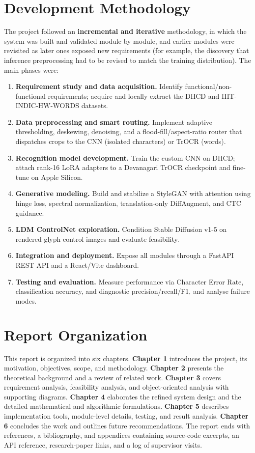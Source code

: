 \documentclass[12pt,a4paper]{report}
\begin{document}
\section{Development Methodology}
The project followed an \textbf{incremental and iterative} methodology, in which the system was built and validated module by module, and earlier modules were revisited as later ones exposed new requirements (for example, the discovery that inference preprocessing had to be revised to match the training distribution). The main phases were:
\begin{enumerate}[itemsep=2pt]
  \item \textbf{Requirement study and data acquisition.} Identify functional/non-functional requirements; acquire and locally extract the DHCD and IIIT-INDIC-HW-WORDS datasets.
  \item \textbf{Data preprocessing and smart routing.} Implement adaptive thresholding, deskewing, denoising, and a flood-fill/aspect-ratio router that dispatches crops to the CNN (isolated characters) or TrOCR (words).
  \item \textbf{Recognition model development.} Train the custom CNN on DHCD; attach rank-16 LoRA adapters to a Devanagari TrOCR checkpoint and fine-tune on Apple Silicon.
  \item \textbf{Generative modeling.} Build and stabilize a StyleGAN with attention using hinge loss, spectral normalization, translation-only DiffAugment, and CTC guidance.
  \item \textbf{LDM ControlNet exploration.} Condition Stable Diffusion v1-5 on rendered-glyph control images and evaluate feasibility.
  \item \textbf{Integration and deployment.} Expose all modules through a FastAPI REST API and a React/Vite dashboard.
  \item \textbf{Testing and evaluation.} Measure performance via Character Error Rate, classification accuracy, and diagnostic precision/recall/F1, and analyse failure modes.
\end{enumerate}

\section{Report Organization}
This report is organized into six chapters. \textbf{Chapter 1} introduces the project, its motivation, objectives, scope, and methodology. \textbf{Chapter 2} presents the theoretical background and a review of related work. \textbf{Chapter 3} covers requirement analysis, feasibility analysis, and object-oriented analysis with supporting diagrams. \textbf{Chapter 4} elaborates the refined system design and the detailed mathematical and algorithmic formulations. \textbf{Chapter 5} describes implementation tools, module-level details, testing, and result analysis. \textbf{Chapter 6} concludes the work and outlines future recommendations. The report ends with references, a bibliography, and appendices containing source-code excerpts, an API reference, research-paper links, and a log of supervisor visits.
\end{document}
